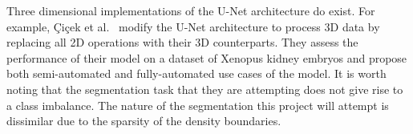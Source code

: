 Three dimensional implementations of the U-Net architecture do exist. For example, {\c{C}}i{\c{c}}ek et al.~\cite{cicek} modify the U-Net architecture to process 3D data by replacing all 2D operations with their 3D counterparts. They assess the performance of their model on a dataset of Xenopus kidney embryos and propose both semi-automated and fully-automated use cases of the model. It is worth noting that the segmentation task that they are attempting does not give rise to a class imbalance. The nature of the segmentation this project will attempt is dissimilar due to the sparsity of the density boundaries.



 



